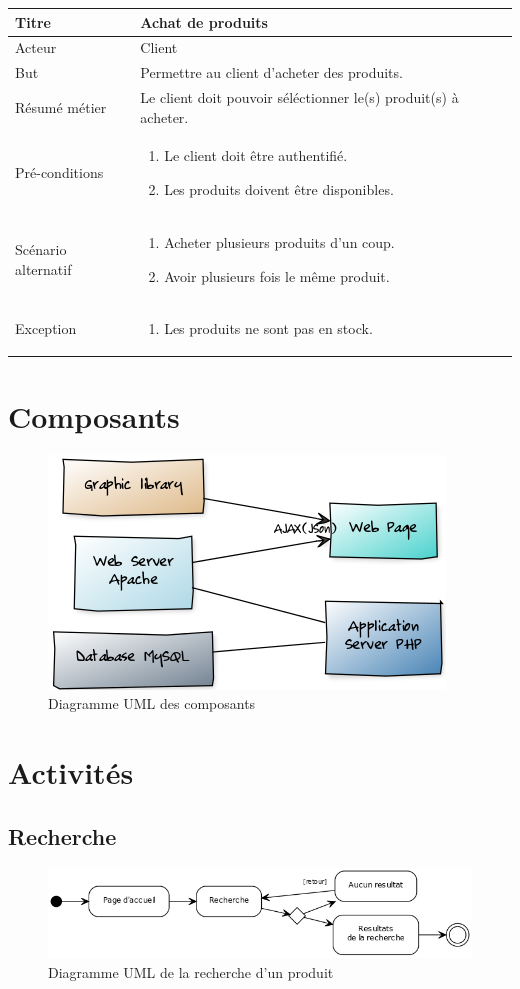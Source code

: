 \documentclass[12pt]{article}
\newcommand\addrow[2]{#1 &#2\\ }
\newcommand\addheading[2]{\textbf{#1} &#2\\ \hline}
\newcommand\tabularhead{\begin{tabular}{lp{11cm}}
\hline
}
\newcommand\addmulrow[2]{ \begin{minipage}[t][][t]{3.5cm}#1\end{minipage}%
    &\begin{minipage}[t][][t]{11cm}
    \begin{enumerate} #2   \end{enumerate}
    \end{minipage}\\ }
\newenvironment{usecase}{\tabularhead}
{\hline\end{tabular}}
\begin{document}
\begin{usecase}
    \addheading{Titre}{Achat de produits}
    \addrow{Acteur}{Client}
    \addrow{But}{Permettre au client d'acheter des produits.}
    \addrow{Résumé métier}{Le client doit pouvoir séléctionner le(s) produit(s) à acheter.}
    \addmulrow{Pré-conditions}{
    \item Le client doit être authentifié.
    \item Les produits doivent être disponibles.
    }
    \addmulrow{Scénario alternatif}{
    \item Acheter plusieurs produits d'un coup.
    \item Avoir plusieurs fois le même produit.
    }
    \addmulrow{Exception}{
    \item Les produits ne sont pas en stock.
    }
\end{usecase}

\newpage
\section{Composants}

\begin{figure}[ht]
    \center
    \includegraphics[scale=0.6]{../Diagrams/ComposantDiagrams/composants.png}
    \caption*{Diagramme UML des composants}
\end{figure}

\newpage
\section{Activités}

\subsection{Recherche}

\begin{figure}[ht]
    \center
    \includegraphics[scale=0.6]{../Diagrams/ActivityDiagrams/recherche.png}
    \caption*{Diagramme UML de la recherche d'un produit}
\end{figure}
\end{document}
